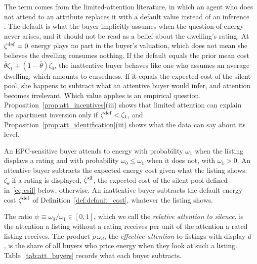 The term comes from the limited-attention literature, in which an agent who does not attend to an attribute replaces it with a default value instead of an inference \citep{gabaix_sparsity_2014, gabaix_behavioral_2019}. The default is what the buyer implicitly assumes when the question of energy never arises, and it should not be read as a belief about the dwelling's rating. At $\zeta^{\rm def}=0$ energy plays no part in the buyer's valuation, which does not mean she believes the dwelling consumes nothing. If the default equals the prior mean cost $\bar\theta \zeta_1+(1-\bar\theta)\zeta_0$, the inattentive buyer behaves like one who assumes an average dwelling, which amounts to cursedness. If it equals the expected cost of the silent pool, she happens to subtract what an attentive buyer would infer, and attention becomes irrelevant. Which value applies is an empirical question. Proposition~\ref{prop:att_incentives}(iii) shows that limited attention can explain the apartment inversion only if $\zeta^{\rm def}<\zeta_1$, and Proposition~\ref{prop:att_identification}(iii) shows what the data can say about its level.

\begin{assumption}
\label{assum:attention}
An EPC-sensitive buyer attends to energy with probability $\omega_1$ when the listing displays a rating and with probability $\omega_0\le\omega_1$ when it does not, with $\omega_1>0$. An attentive buyer subtracts the expected energy cost given what the listing shows: $\zeta_\theta$ if a rating is displayed, $\bar \zeta^{\rm sil}$, the expected cost of the silent pool defined in~\eqref{eq:csil} below, otherwise. An inattentive buyer subtracts the default energy cost $\zeta^{\rm def}$ of Definition~\ref{def:default_cost}, whatever the listing shows.
\end{assumption}

The ratio $\psi\equiv\omega_0/\omega_1\in[0,1]$, which we call the \emph{relative attention to silence}, is the attention a listing without a rating receives per unit of the attention a rated listing receives. The product $\rho\,\omega_d$, the \emph{effective attention} to listings with display $d$, is the share of all buyers who price energy when they look at such a listing. Table~\ref{tab:att_buyers} records what each buyer subtracts.

